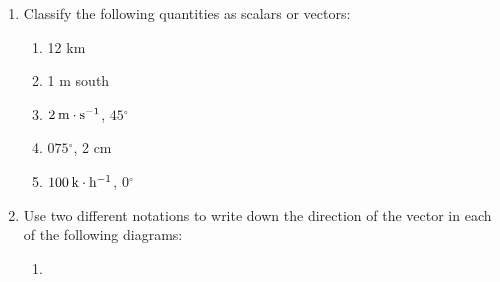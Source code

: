         \label{m38812*id187475}\begin{enumerate}[noitemsep, label=\textbf{\arabic*}. ] 
            \label{m38812*uid8}\item Classify the following quantities as scalars or vectors:
\label{m38812*id187490}\begin{enumerate}[noitemsep, label=\textbf{\alph*}. ] 
            \label{m38812*uid9}\item 12 km
\label{m38812*uid10}\item 1 m south
\label{m38812*uid11}\item \begin{math}2\phantom{\rule{2pt}{0ex}}\mathrm{m}\ensuremath{\cdot}{\mathrm{s}}^{-1}\end{math}, \begin{math}45{}^{\circ }\end{math}\label{m38812*uid12}\item \begin{math}075{}^{\circ }\end{math}, 2 cm
\label{m38812*uid13}\item \begin{math}100\phantom{\rule{2pt}{0ex}}\mathrm{k}\ensuremath{\cdot}{\mathrm{h}}^{-1}\end{math}, \begin{math}0{}^{\circ }\end{math}\end{enumerate}
                \label{m38812*uid14}\item Use two different notations to write down the direction of the vector in each of the following diagrams:
\label{m38812*id187643}\begin{enumerate}[noitemsep, label=\textbf{\alph*}. ] 
            \label{m38812*uid15}\item 
    \setcounter{subfigure}{0}



\end{enumerate}
\end{enumerate}
